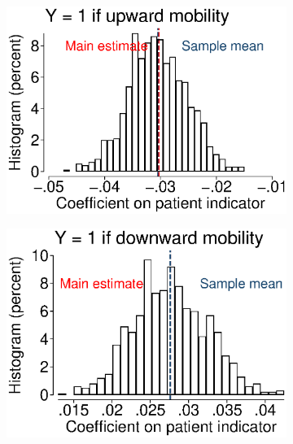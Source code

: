 \documentclass[12pt,english]{article}
\begin{document}
\begin{figure}[!ht]
\caption[Randomly assign lower father's SES to 15\% of patients 1000 times]{Randomly assign lower father's SES to 15\% of patients 1000 times}
\centering
\begin{subfigure}{0.49\textwidth}
	\centering
	\includegraphics[width=1.00\linewidth]{../output/02_appendix/figure_a08_panel_01.eps}
\end{subfigure}
\begin{subfigure}{0.49\textwidth}
	\centering
	\includegraphics[width=1.00\linewidth]{../output/02_appendix/figure_a08_panel_02.eps}
\end{subfigure}
\begin{subfigure}{0.49\textwidth}

\end{subfigure}
\end{figure}
\end{document}
